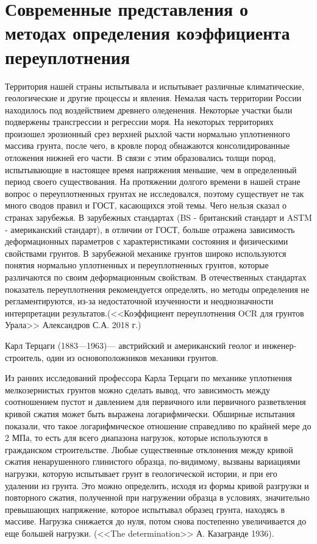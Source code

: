 \chapter{Современные представления о методах определения коэффициента переуплотнения}

Территория нашей страны испытывала и испытывает различные климатические, геологические и другие процессы и явления. Немалая часть территории России находилось под воздействием древнего оледенения. Некоторые участки были подвержены трансгрессии и регрессии моря. На некоторых территориях произошел эрозионный срез верхней рыхлой части нормально уплотненного массива грунта, после чего, в кровле пород обнажаются консолидированные отложения нижней его части. В связи с этим образовались толщи пород, испытывающие в настоящее время напряжения меньшие, чем в определенный период своего существования.
На протяжении долгого времени в нашей стране вопрос о переуплотненных грунтах не исследовался, поэтому существует не так много сводов правил и ГОСТ, касающихся этой темы. Чего нельзя сказал о странах зарубежья. 
В зарубежных стандартах (BS - британский стандарт и ASTM - американский стандарт), в отличии от ГОСТ, больше отражена зависимость деформационных параметров с характеристиками состояния и физическими свойствами грунтов. В зарубежной механике грунтов широко используются понятия нормально уплотненных и переуплотненных грунтов, которые различаются по своим деформационным свойствам. В отечественных стандартах показатель переуплотнения рекомендуется определять, но методы определения не регламентируются, из-за недостаточной изученности и неоднозначности интерпретации результатов.(<<Коэффициент переуплотнения OCR  для грунтов Урала>> Александров С.А. 2018 г.)

Карл Терцаги (1883—1963)— австрийский и американский геолог и инженер-строитель, один из основоположников механики грунтов.

Из ранних исследований профессора Карла Терцаги по механике уплотнения мелкозернистых грунтов можно сделать вывод, что зависимость между соотношением пустот и давлением для первичного или первичного разветвления кривой сжатия может быть выражена логарифмически. Обширные испытания показали, что такое логарифмическое отношение справедливо по крайней мере до 2 МПа, то есть для всего диапазона нагрузок, которые используются в гражданском строительстве. Любые существенные отклонения между кривой сжатия ненарушенного глинистого образца, по-видимому, вызваны вариациями нагрузки, которую испытывает грунт в геологической истории, и при его удалении из грунта. Это можно определить, исходя из формы кривой разгрузки и повторного сжатия, полученной при нагружении образца в условиях, значительно превышающих напряжение, которое испытывал образец грунта, находясь в массиве. Нагрузка снижается до нуля, потом снова постепенно увеличивается до еще большей нагрузки. (<<The determination>> А. Казагранде 1936). 
 
